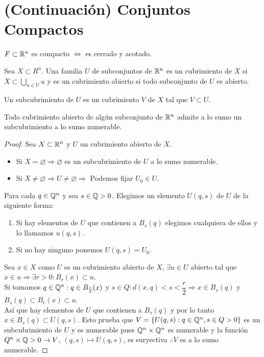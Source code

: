 \section{(Continuación) Conjuntos Compactos}

\begin{corollary}
  $F \subset \mathbb{R}^n$ es compacto $\iff$ es cerrado y acotado.
\end{corollary}

\begin{definition}[Cubrimiento]
  Sea $X \subset R^n$. Una familia $U$ de subconjuntos de $\mathbb{R}^n$ es un cubrimiento de $X$ si $X \subset \bigcup_{u \in U} u$ y es un cubrimiento abierto si todo subconjunto de $U$ es abierto.
\end{definition}

\begin{definition}[Subcubrimiento]
  Un subcubrimiento de $U$ es un cubrimiento $V$ de $X$ tal que $V \subset U$.
\end{definition}

\clearpage

\begin{theorem}[Lindelöf]
  Todo cubrimiento abierto de algún subconjunto de $\mathbb{R}^n$ admite a lo sumo un subcubrimiento a lo sumo numerable.
  \begin{proof}
    Sea $X \subset \mathbb{R}^n$ y $U$ un cubrimiento abierto de $X$.
    \begin{itemize}
      \item Si $X = \varnothing \Rightarrow \varnothing$ es un subcubrimiento de $U$ a lo
            sumo numerable.
      \item Si $X \neq \varnothing \Rightarrow U \neq \varnothing \Rightarrow$ Podemos
            fijar $U_0 \in U$.
    \end{itemize}
    Para cada $q \in \mathbb{Q}^n$ y sea $s \in \mathbb{Q} > 0$. Elegimos un elemento $U(q, s)$ de $U$ de la siguiente forma:
    \begin{enumerate}
      \item Si hay elementos de $U$ que contienen a $B_s(q)$ elegimos cualquiera de ellos y
            lo llamamos $u(q, s)$.
      \item Si no hay ninguno ponemos $U(q, s) = U_0$.
    \end{enumerate}
    Sea $x \in X$ como $U$ es un cubrimiento abierto de $X$, $\exists u \in U$ abierto tal que $x \in u \Rightarrow \exists r > 0 : B_r(x) \subset u$. \\
    Si tomamos $q \in \mathbb{Q}^n : q \in B_{\frac{r}{2}}(x)$ y $s \in Q : d(x, q) < s < \dfrac{r}{2} \Rightarrow x \in B_s(q)$ y $B_s(q) \subset B_r(x) \subset u$. \\
    Así que hay elementos de $U$ que contienen a $B_s(q)$ y por lo tanto $x \in B_s(q) \subset U(q, s)$. Esto prueba que $V = \{ U(q, s) : q \in \mathbb{Q}^n, s \in Q > 0 \}$ es un subcubrimiento de $U$ y es numerable pues $\mathbb{Q}^n \times \mathbb{Q}^n$ es numerable y la función $Q^n \times \mathbb{Q} > 0 \to V$, $(q, s) \mapsto U(q, s)$, es suryectiva $\therefore V$ es a lo sumo numerable.
  \end{proof}
\end{theorem}

